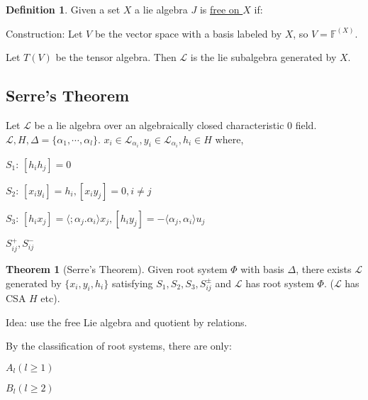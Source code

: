 \documentclass{article}
\theoremstyle{definition}
\newtheorem*{definition}{Definition}
\newtheorem{theorem}{Theorem}
\begin{document}
    \begin{definition}
        Given a set \(X\) a lie algebra \(J\) is \underline{free on \(X\)} if:

        \begin{center}
        \end{center}
    \end{definition}
    
    Construction: Let \(V\) be the vector space with a basis labeled by \(X\), so \(V =\mathbb{F}^{(X)}\).

    Let \(T(V)\) be the tensor algebra. Then \(\mathcal{L}\) is the lie subalgebra generated by \(X\).

    \subsection*{Serre's Theorem}

    Let \(\mathcal{L}\) be a lie algebra over an algebraically closed characteristic \(0\) field. \(\mathcal{L} , H, \Delta = \{ \alpha_1, \cdots , \alpha_l \}\). \(x_i\in \mathcal{L}_{\alpha_i}, y_i \in \mathcal{L}_{\alpha_i}, h_i \in H\) where,
      
    \(S_1\): \([h_i h_j] = 0\) 

    \(S_2\): \([x_i y_i] = h_i, [x_i y_j] = 0, i \neq j\) 
    
    \(S_3\): \([h_i x_j] = \langle ;\alpha_j. \alpha_i \rangle x_j, [h_i y_j] = - \langle \alpha_j, \alpha_i \rangle u_j\) 

    \(S_{ij}^+, S_{ij}^-\) 

    \begin{theorem}
        [Serre's Theorem] Given root system \(\Phi\) with basis \(\Delta\), there exists \(\mathcal{L}\) generated by \(\{ x_i, y_i, h_i \}\) satisfying \(S_1, S_2, S_3, S_{ij}^\pm\) and \(\mathcal{L}\) has root system \(\Phi\). (\(\mathcal{L}\) has CSA \(H\) etc).
    \end{theorem}

    Idea: use the free Lie algebra and quotient by relations.

    By the classification of root systems, there are only:
    
    \(A_l (l \geq 1)\)
    
    \(B_l (l\geq 2)\)
    
\end{document}
